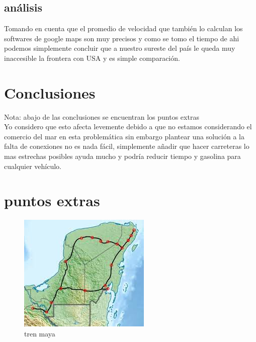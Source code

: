 \documentclass{article}
\begin{document}
\subsection*{análisis}
Tomando en cuenta que el promedio de velocidad que también lo calculan los softwares
de google maps son muy precisos y como se tomo el tiempo de ahi podemos simplemente concluir que 
a nuestro sureste del país le queda muy inaccesible la frontera con USA y es simple comparación. 

\section{Conclusiones}\label{Conclusiones}				%
Nota: abajo de las conclusiones se encuentran los puntos extras
\\
Yo considero que esto afecta levemente debido a que no estamos considerando el comercio del mar 
en esta problemática sin embargo plantear una solución a la falta de conexiones no es nada fácil,
simplemente añadir que hacer carreteras lo mas estrechas posibles ayuda mucho y podría reducir tiempo 
y gasolina para cualquier vehículo.



\section{puntos extras}

\begin{figure}[H]
  \centering
  \includegraphics[scale=0.9]{../imgs/Untitled.jpg}
  \caption{tren maya}
  \label{fig:17}
\end{figure}
\end{document}
